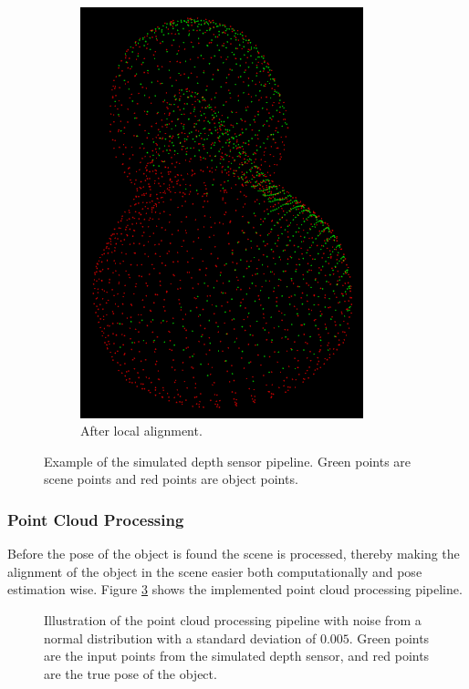 \documentclass[../main.tex]{subfiles}
\begin{document}
\begin{figure}[H]
\begin{subfigure}[t]{0.2\textwidth}
        \includegraphics[width=0.9\textwidth]{figures/simulated_depth_sensor/after_local_alignment.png}
        \caption{After local alignment.}
        \label{subfig:sds_after_local}
    \end{subfigure}
    \caption{Example of the simulated depth sensor pipeline. Green points are scene points and red points are object points.}
    \label{fig:sds_pictures}
\end{figure}

\subsubsection{Point Cloud Processing} \label{subsubsec:filter_input}
Before the pose of the object is found the scene is processed, thereby making the alignment of the object in the scene easier both computationally and pose estimation wise. Figure \ref{fig:filter_process} shows the implemented point cloud processing pipeline. 

\begin{figure}[H]
    \centering
    \noindent\makebox[\textwidth][c]{}
    \caption{Illustration of the point cloud processing pipeline with noise from a normal distribution with a standard deviation of $0.005$. Green points are the input points from the simulated depth sensor, and red points are the true pose of the object.}
    \label{fig:filter_process}
\end{figure}
\end{document}

